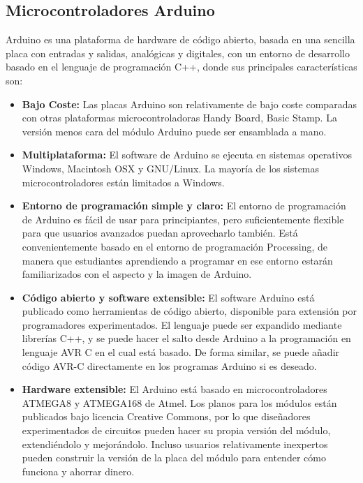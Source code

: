 \documentclass[12pt,a4paper]{article}
\begin{document}
\subsection{Microcontroladores Arduino}
Arduino\cite{ARDUINO} es una plataforma de hardware de código abierto, basada en una sencilla placa con entradas y salidas, analógicas y digitales, con un entorno de desarrollo basado en el lenguaje de programación C++, donde sus principales características son:
\begin{itemize}
	\item \textbf{Bajo Coste:} Las placas Arduino son relativamente de bajo coste comparadas con otras plataformas microcontroladoras Handy Board, Basic Stamp\textregistered. La versión menos cara del módulo Arduino puede ser ensamblada a mano.
	\item \textbf{Multiplataforma:} El software de Arduino se ejecuta en sistemas operativos Windows, Macintosh OSX y GNU/Linux. La mayoría de los sistemas microcontroladores están limitados a Windows.
	\item \textbf{Entorno de programación simple y claro:} El entorno de programación de Arduino es fácil de usar para principiantes, pero suficientemente flexible para que usuarios avanzados puedan aprovecharlo también. Está convenientemente basado en el entorno de programación Processing, de manera que estudiantes aprendiendo a programar en ese entorno estarán familiarizados con el aspecto y la imagen de Arduino.
	\item \textbf{Código abierto y software extensible:} El software Arduino está publicado como herramientas de código abierto, disponible para extensión por programadores experimentados. El lenguaje puede ser expandido mediante librerías C++, y se puede hacer el salto desde Arduino a la programación en lenguaje AVR C en el cual está basado. De forma similar, se puede añadir código AVR-C directamente en los  programas Arduino si es deseado.
	\item \textbf{Hardware extensible:} El Arduino está basado en microcontroladores ATMEGA8 y ATMEGA168 de Atmel. Los planos para los módulos están publicados bajo licencia Creative Commons, por lo que diseñadores experimentados de circuitos pueden hacer su propia versión del módulo, extendiéndolo y mejorándolo. Incluso usuarios relativamente inexpertos pueden construir la versión de la placa del módulo para entender cómo funciona y ahorrar dinero.
	
\end{itemize}
\end{document}
